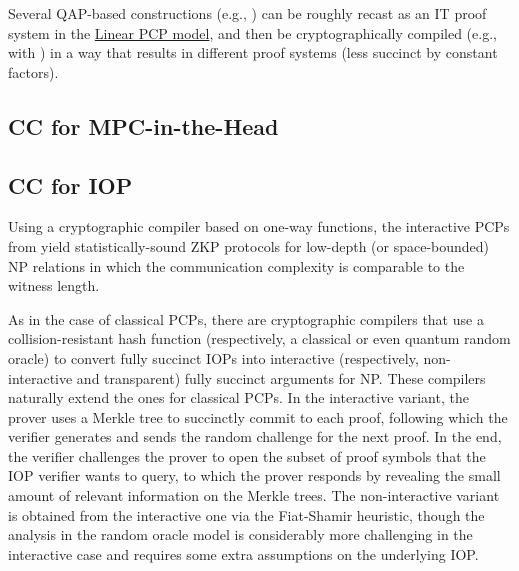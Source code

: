 Several QAP-based constructions (e.g., \cite{2013:GGPR:eurocrypt:QSPs-and-succinct-NIZKs-without-PCPs,2016:Eurocrypt:On-the-Size-of-Pairing-Based-Non-interactive-Arguments}) can be roughly recast as an IT proof system in the \hyperref[paradigms:IT:linear-PCP]{Linear PCP model}, and then be cryptographically compiled (e.g., with \cite{2013:tcc:snargs-via-LIPs}) in a way that results in different proof systems (less succinct by constant factors).


\subsection{CC for MPC-in-the-Head}
\label{sec:CC-MitH}



\subsection{CC for IOP}
\label{sec:CC-IOP}

Using a cryptographic compiler \cite{1988:BGGHKMR:everything-provable} based on one-way functions, the interactive PCPs from  yield statistically-sound ZKP protocols for low-depth (or space-bounded) NP relations in which the communication complexity is comparable to the witness length. 
\loosen

As in the case of classical PCPs, there are cryptographic compilers that use a collision-resistant hash function (respectively, a classical or even quantum random oracle) \cite{2019:CMS:succinct-args-quantum-ROM} to convert fully succinct IOPs into interactive (respectively, non-interactive and transparent) fully succinct arguments for NP.
These compilers naturally extend the ones for classical PCPs. In the interactive variant, the prover uses a Merkle tree to succinctly commit to each proof, following which the verifier generates and sends the random challenge for the next proof.
In the end, the verifier challenges the prover to open the subset of proof symbols that the IOP verifier wants to query, to which the prover responds by revealing the small amount of relevant information on the Merkle trees.
The non-interactive variant is obtained from the interactive one via the Fiat-Shamir heuristic, though the analysis in the random oracle model is considerably more challenging in the interactive case and requires some extra assumptions on the underlying IOP.

